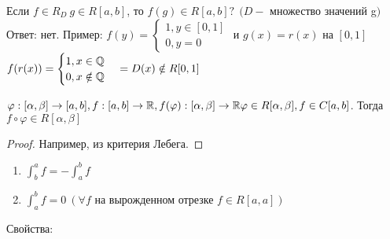 \begin{Example}
	Если $f \in R_D \ g \in R[a, b]$, то $f(g) \in R[a,b]\text{?} \ \ (D -$ множество значений g$)$\\
	Ответ: нет. Пример: 
	$f(y) = 
	\begin{cases}
		1, y \in [0,1] \\
		0, y = 0
	\end{cases}$  и $g(x) = r(x)$ на $[0,1]$\\
	$f(r(x)) = 
	\begin{cases}
		1, x \in \mathbb{Q} \\
		0, x \notin \mathbb{Q} 
	\end{cases} = D(x) \notin R[0,1]$
\end{Example}

\begin{Thm}
	$\varphi: [\alpha, \beta] \to [a, b], f: [a,b] \to \mathbb{R},\\ f(\varphi): [\alpha, \beta] \to \mathbb{R}\\
	\varphi \in R[\alpha, \beta], f \in C[a,b]$. Тогда $f \circ \varphi \in R[\alpha, \beta]$ 
\end{Thm} 

\begin{proof}
	Например, из критерия Лебега.
\end{proof}

\begin{enumerate}
	\item $\displaystyle \int_{b}^{a} f = - \int_{a}^{b} f$ 
	\item $\displaystyle \int_{a}^{b} f = 0 \ (\forall f \text{ на вырожденном отрезке } f \in R [a,a])$
\end{enumerate}

Свойства:

